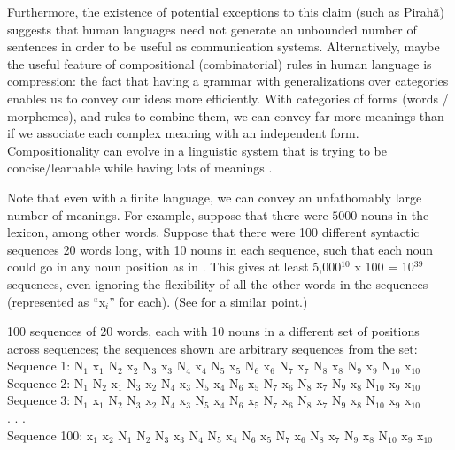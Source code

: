 \documentclass{article}
\begin{document}
Furthermore, the existence of potential exceptions to this claim (such as Pirahã) suggests that human languages need not generate an unbounded number of sentences in order to be useful as communication systems. Alternatively, maybe the useful feature of compositional (combinatorial) rules in human language is compression: the fact that having a grammar with generalizations over categories enables us to convey our ideas more efficiently. With categories of forms (words / morphemes), and rules to combine them, we can convey far more meanings than if we associate each complex meaning with an independent form. Compositionality can evolve in a linguistic system that is trying to be concise/learnable while having lots of meanings \citep{kirby2000syntax}.


Note that even with a finite language, we can convey an unfathomably large number of meanings. For example, suppose that there were $5000$ nouns in the lexicon, among other words. Suppose that there were 100 different syntactic sequences 20 words long, with 10 nouns in each sequence, such that each noun could go in any noun position as in . This gives at least 5,000$^{10}$ x 100 = 10$^{39}$ sequences, even ignoring the flexibility of all the other words in the sequences (represented as ``x$_i$'' for each). (See \cite{muller2016grammatical} for a similar point.)

\ea
\label{ex1}
100 sequences of 20 words, each with 10 nouns in a different set of positions across sequences; the sequences shown are arbitrary sequences from the set:\\
Sequence 1: N$_1$ x$_1$ N$_2$ x$_2$ N$_3$ x$_3$ N$_4$ x$_4$ N$_5$ x$_5$ N$_6$ x$_6$ N$_7$ x$_7$ N$_8$ x$_8$ N$_9$ x$_9$ N$_{10}$ x$_{10}$\\
Sequence 2: N$_1$ N$_2$ x$_1$ N$_3$ x$_2$ N$_4$ x$_3$ N$_5$ x$_4$ N$_6$ x$_5$ N$_7$ x$_6$ N$_8$ x$_7$ N$_9$ x$_8$ N$_{10}$ x$_9$ x$_{10}$\\
Sequence 3: N$_1$ x$_1$ N$_2$ N$_3$ x$_2$ N$_4$ x$_3$ N$_5$ x$_4$ N$_6$ x$_5$ N$_7$ x$_6$ N$_8$ x$_7$ N$_9$ x$_8$ N$_{10}$ x$_9$ x$_{10}$\\
. . .\\
Sequence 100: x$_1$ x$_2$ N$_1$ N$_2$ N$_3$ x$_3$ N$_4$ N$_5$ x$_4$ N$_6$ x$_5$ N$_7$ x$_6$ N$_8$ x$_7$ N$_9$ x$_8$ N$_{10}$ x$_9$ x$_{10}$
\z
\end{document}
